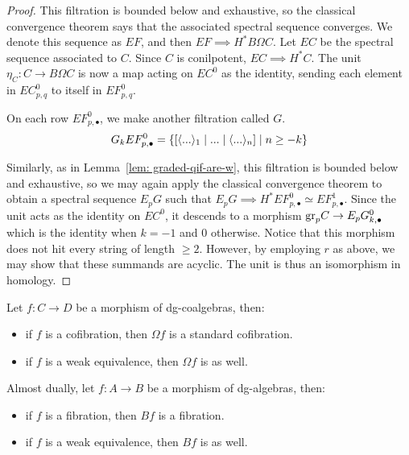 \documentclass[../thesis.tex]{subfiles}
\begin{document}
\begin{proof}
                This filtration is bounded below and exhaustive, so the classical convergence theorem says that the associated spectral sequence converges. We denote this sequence as $EF$, and then $EF \implies H^*B\Omega C$. Let $EC$ be the spectral sequence associated to $C$. Since $C$ is conilpotent, $EC \implies H^*C$. The unit $\eta_C: C \rightarrow B\Omega C$ is now a map acting on $EC^0$ as the identity, sending each element in $EC^0_{p,q}$ to itself in $EF^0_{p,q}$.
                
                On each row $EF^0_{p,\bullet}$, we make another filtration called $G$.
                \begin{align*}
                    G_kEF^0_{p,\bullet} = \startset{[\langle ... \rangle_1 \mid ... \mid \langle ... \rangle_n] \mid n \geq -k}
                \end{align*}

                Similarly, as in Lemma~\ref{lem: graded-qif-are-w}, this filtration is bounded below and exhaustive, so we may again apply the classical convergence theorem to obtain a spectral sequence $E_pG$ such that $E_pG \implies H^*EF^0_{p,\bullet} \simeq EF^1_{p,\bullet}$. Since the unit acts as the identity on $EC^0$, it descends to a morphism $\tt{gr}_pC \rightarrow E_pG^0_{k,\bullet}$ which is the identity when $k = -1$ and $0$ otherwise. Notice that this morphism does not hit every string of length $\geq 2$. However, by employing $r$ as above, we may show that these summands are acyclic. The unit is thus an isomorphism in homology.

            \end{proof}

            \begin{lemma}\label{lem: bar-cobar-Quill-adj}
                Let $f: C\rightarrow D$ be a morphism of dg-coalgebras, then:
                \begin{itemize}
                    \item if $f$ is a cofibration, then $\Omega f$ is a standard cofibration.
                    \item if $f$ is a weak equivalence, then $\Omega f$ is as well.
                \end{itemize}

                Almost dually, let $f: A\rightarrow B$ be a morphism of dg-algebras, then:
                \begin{itemize}
                    \item if $f$ is a fibration, then $B f$ is a fibration.
                    \item if $f$ is a weak equivalence, then $B f$ is as well.
                \end{itemize}
            \end{lemma}
\end{document}
